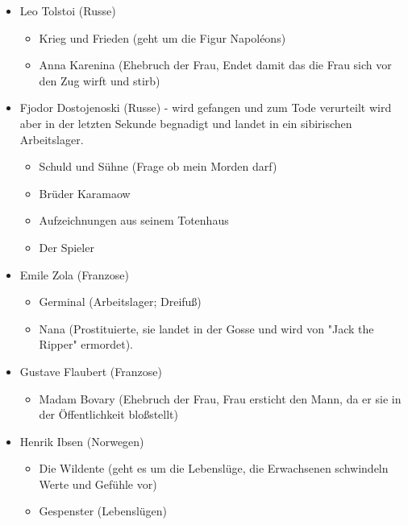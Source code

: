 \documentclass[12pt,a4paper]{article}
\begin{document}
\begin{itemize}
\item Leo Tolstoi (Russe)

	\begin{itemize}
	\item Krieg und Frieden (geht um die Figur Napoléons)
	\item Anna Karenina (Ehebruch der Frau, Endet damit das die Frau sich vor den Zug wirft und stirb)
	\end{itemize}
	
\item Fjodor Dostojenoski (Russe) - wird gefangen und zum Tode verurteilt wird aber in der letzten Sekunde begnadigt und landet in ein sibirischen Arbeitslager.

	\begin{itemize}
	\item Schuld und Sühne (Frage ob mein Morden darf)
	\item Brüder Karamaow 
	\item Aufzeichnungen aus seinem Totenhaus
	\item Der Spieler
	\end{itemize}
	
\item Emile Zola (Franzose)
	
	\begin{itemize}
	\item Germinal (Arbeitslager; Dreifuß)
	\item Nana (Prostituierte, sie landet in der Gosse und wird von "Jack the Ripper" ermordet).
	\end{itemize}
	
\item Gustave Flaubert (Franzose)

	\begin{itemize}
	\item Madam Bovary (Ehebruch der Frau, Frau ersticht den Mann, da er sie in der Öffentlichkeit bloßstellt)
	\end{itemize}
	
\item Henrik Ibsen (Norwegen)

	\begin{itemize}
	\item Die Wildente (geht es um die Lebenslüge, die Erwachsenen schwindeln Werte und Gefühle vor)
	\item Gespenster (Lebenslügen)
	\end{itemize}		
	
\end{itemize}
\end{document}
